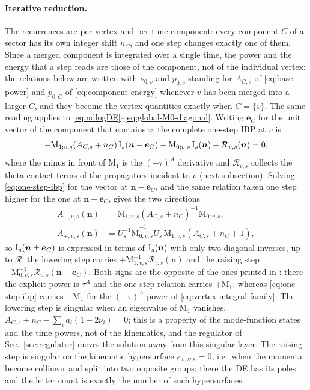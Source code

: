 \documentclass[11pt,a4paper]{article}
\newcommand{\cR}{\mathcal R}
\begin{document}
\paragraph{Iterative reduction.}
The recurrences are per vertex and per time component: every component $C$ of a sector has its own
integer shift $n_C$, and one step changes exactly one of them. Since a merged component is
integrated over a single time, the power and the energy that a step reads are those of the component,
not of the individual vertex: the relations below are written with $\nu_{0,v}$ and $p_{0,v}$ standing
for $A_{C,s}$ of \eqref{eq:base-power} and $p_{0,C}$ of \eqref{eq:component-energy} whenever $v$ has
been merged into a larger $C$, and they become the vertex quantities exactly when $C=\{v\}$. The
same reading applies to \eqref{eq:ndlogDE}--\eqref{eq:global-M0-diagonal}. Writing $\bm e_C$ for the
unit vector of the component that contains $v$, the complete one-step IBP at $v$ is
\begin{equation}
  -\text{M}_{1;v,s}(A_{C,s}+n_C)\,\bm{\text I}_s(\bm n-\bm e_C)
  +\text{M}_{0;v,s}\,\bm{\text I}_s(\bm n)
  +\cR_{v,s}(\bm n)=0,
  \label{eq:one-step-ibp}
\end{equation}
where the minus in front of $\text{M}_1$ is the $(-\tau)^A$ derivative and $\cR_{v,s}$ collects the
theta contact terms of the propagators incident to $v$ (next subsection). Solving
\eqref{eq:one-step-ibp} for the vector at $\bm n-\bm e_C$, and the same relation taken one step
higher for the one at $\bm n+\bm e_C$, gives the two directions
\begin{align}
  A_{-,v,s}(\bm n)&=\text{M}_{1;v,s}(A_{C,s}+n_C)^{-1}\text{M}_{0;v,s},
  \label{eq:global-Aminus}\\
  A_{+,v,s}(\bm n)&=U_s^{-1}\widetilde{\text{M}}_{0;v,s}^{-1}U_s\,
  \text{M}_{1;v,s}(A_{C,s}+n_C+1),
  \label{eq:global-Aplus}
\end{align}
so $\bm{\text I}_s(\bm n\pm\bm e_C)$ is expressed in terms of $\bm{\text I}_s(\bm n)$ with only two
diagonal inverses, up to $\cR$: the lowering step carries $+\text{M}_{1;v,s}^{-1}\cR_{v,s}(\bm n)$
and the raising step
$-\text{M}_{0;v,s}^{-1}\cR_{v,s}(\bm n+\bm e_C)$. Both signs are the opposite of the ones printed in
\cite{Chen:2023iix}: there the explicit power is $\tau^A$ and the one-step relation
carries $+\text{M}_1$, whereas \eqref{eq:one-step-ibp} carries $-\text{M}_1$ for the $(-\tau)^A$
power of \eqref{eq:vertex-integral-family}. The lowering step is singular when an eigenvalue of $\text{M}_1$ vanishes,
$A_{C,s}+n_C-\sum_ia_i(1-2\nu_i)=0$; this is a property of the mode-function states and the time
powers, not of the kinematics, and the regulator of Sec.~\ref{sec:regulator} moves the solution away
from this singular layer. The raising
step is singular on the kinematic hypersurface $\kappa_{v,s;\bm a}=0$, i.e.\ when the momenta
become collinear and split into two opposite groups; there the DE has its poles, and the letter
count is exactly the number of such hypersurfaces.
\end{document}

